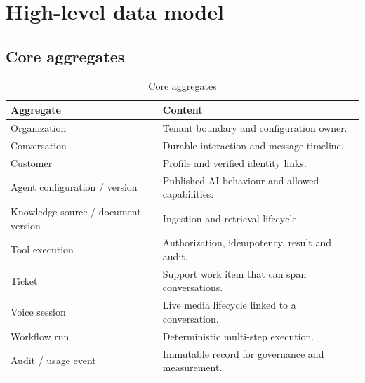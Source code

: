 \chapter{High-level data model}

\section{Core aggregates}
\begin{table}[htbp]
\centering\caption{Core aggregates}\label{tab:aggregates}
\begin{tabular}{@{}p{4.2cm}p{11.8cm}@{}}
\toprule \textbf{Aggregate} & \textbf{Content} \\ \midrule
Organization & Tenant boundary and configuration owner. \\
Conversation & Durable interaction and message timeline. \\
Customer & Profile and verified identity links. \\
Agent configuration / version & Published AI behaviour and allowed capabilities. \\
Knowledge source / document version & Ingestion and retrieval lifecycle. \\
Tool execution & Authorization, idempotency, result and audit. \\
Ticket & Support work item that can span conversations. \\
Voice session & Live media lifecycle linked to a conversation. \\
Workflow run & Deterministic multi-step execution. \\
Audit / usage event & Immutable record for governance and measurement. \\
\bottomrule
\end{tabular}
\end{table}


